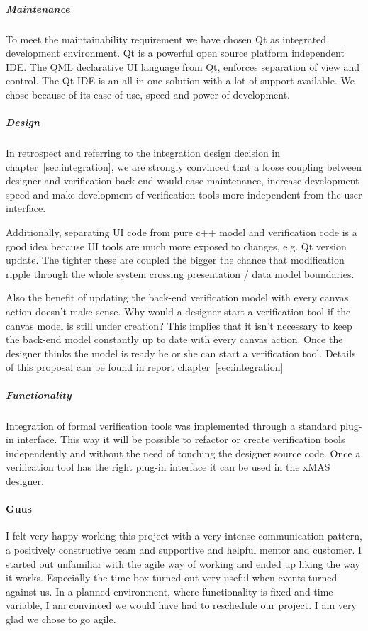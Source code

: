 \subparagraph{Maintenance} To meet the maintainability requirement we have chosen Qt as integrated
development environment. Qt is a powerful open source platform independent IDE.
The QML declarative UI language from Qt, enforces separation of view and control. The
Qt IDE is an all-in-one solution with a lot of support available. We chose \qt because
of its ease of use, speed and power of development. 

\subparagraph{Design} In retrospect and referring to the integration design decision 
in chapter~\ref{sec:integration}, we are strongly convinced that a loose coupling between 
designer and verification back-end would ease maintenance, increase development
speed and make development of verification tools more independent from the 
user interface.

Additionally, separating UI code from pure c++ model and verification code is 
a good idea because UI tools are much more exposed to changes, e.g. 
Qt version update. The tighter these are coupled the bigger the chance that 
modification ripple through the whole system crossing presentation / data model
boundaries.

Also the benefit of updating the back-end verification model with every canvas
action doesn't make sense. Why would a designer start a verification tool if the
canvas model is still under creation? This implies that it isn't necessary to
keep the back-end model constantly up to date with every canvas action. Once the
designer thinks the model is ready he or she can start a verification tool.
Details of this proposal can be found in report chapter~\ref{sec:integration}

\subparagraph{Functionality} Integration of formal verification tools was implemented 
through a standard plug-in interface. This way it will be possible to refactor or create 
verification tools independently and without the need of touching the designer source code. 
Once a verification tool has the right plug-in interface it can be used in the xMAS designer.

\paragraph{Guus} I felt very happy working this project with a very intense communication pattern,
a positively constructive team and supportive and helpful mentor and customer. I started out 
unfamiliar with the agile way of working and ended up liking the way it works. 
Especially the time box turned out very useful when events 
turned against us. In a planned environment, where functionality is fixed and time variable, I 
am convinced we would have had to reschedule our project. I am very glad we chose to go agile.

